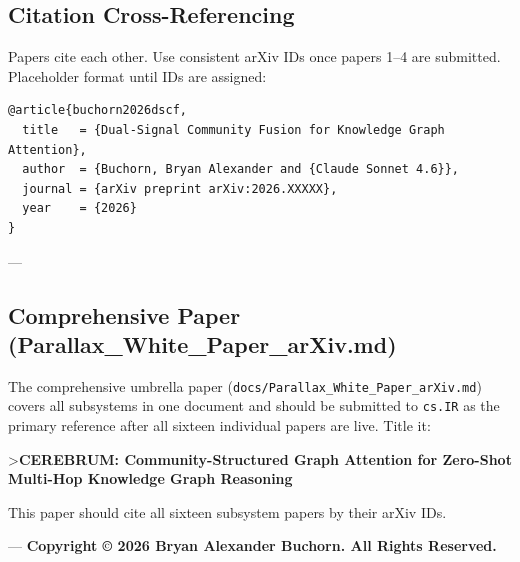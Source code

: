 \documentclass[10pt,journal,compsoc]{IEEEtran}
\begin{document}
\subsection{Citation Cross-Referencing}

Papers cite each other. Use consistent arXiv IDs once papers 1–4 are submitted. Placeholder format until IDs are assigned:

\begin{lstlisting}
@article{buchorn2026dscf,
  title   = {Dual-Signal Community Fusion for Knowledge Graph Attention},
  author  = {Buchorn, Bryan Alexander and {Claude Sonnet 4.6}},
  journal = {arXiv preprint arXiv:2026.XXXXX},
  year    = {2026}
}
\end{lstlisting}

---

\subsection{Compre\-hensive Paper (Parallax\_White\_Paper\_arXiv.md)}

The compr\-ehensive umbrella paper (\texttt{docs/Parallax\_White\_Paper\_arXiv.md}) covers all subsystems in one document and should be submitted to \texttt{cs.IR} as the primary reference after all sixteen individual papers are live. Title it:

\textgreater  \textbf{CEREBRUM: Community-Structured Graph Attention for Zero-Shot Multi-Hop Knowledge Graph Reasoning}

This paper should cite all sixteen subsystem papers by their arXiv IDs.

---
\textbf{Copyright © 2026 Bryan Alexander Buchorn. All Rights Reserved.}




\end{document}
